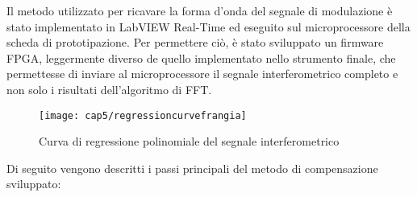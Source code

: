 Il metodo utilizzato per ricavare la forma d'onda del segnale di modulazione è stato implementato in LabVIEW Real-Time ed eseguito sul microprocessore della scheda di prototipazione. Per permettere ciò, è stato sviluppato un firmware FPGA, leggermente diverso de quello implementato nello strumento finale, che permettesse di inviare al microprocessore il segnale interferometrico completo e non solo i risultati dell'algoritmo di FFT.
\begin{figure}[H] 
	\begin{center}
		\texttt{[image: cap5/regressioncurvefrangia]}
		\caption{Curva di regressione polinomiale del segnale interferometrico}
		\label{regressioncurvefrangia}
	\end{center}
\end{figure}

Di seguito vengono descritti i passi principali del metodo di compensazione sviluppato:

